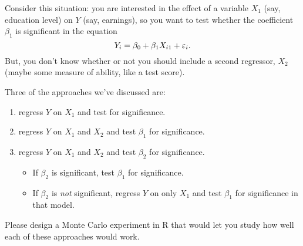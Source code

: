 \begin{hw}
  Consider this situation: you are interested in the effect of a
  variable $X_1$ (say, education level) on $Y$ (say, earnings), so you
  want to test whether the coefficient $\beta_1$ is significant in the
  equation
  \begin{equation*}
    Y_{i} = \beta_0 + \beta_1 X_{i1} + \varepsilon_i.
  \end{equation*}
  But, you don't know whether or not you should include a second
  regressor, $X_2$ (maybe some measure of ability, like a test score).

  Three of the approaches we've discussed are:
  \begin{enumerate}
  \item regress $Y$ on $X_1$ and test for significance.
  \item regress $Y$ on $X_1$ and $X_2$ and test $\beta_1$ for
    significance.
  \item regress $Y$ on $X_1$ and $X_2$ and test $\beta_2$ for
    significance.
    \begin{itemize}
    \item If $\beta_2$ is significant, test $\beta_1$ for
      significance.
    \item If $\beta_2$ is \emph{not} significant, regress $Y$ on only
      $X_1$ and test $\beta_1$ for significance in that model.
    \end{itemize}
  \end{enumerate}

  Please design a Monte Carlo experiment in R that would let you study
  how well each of these approaches would work.
\end{hw}

